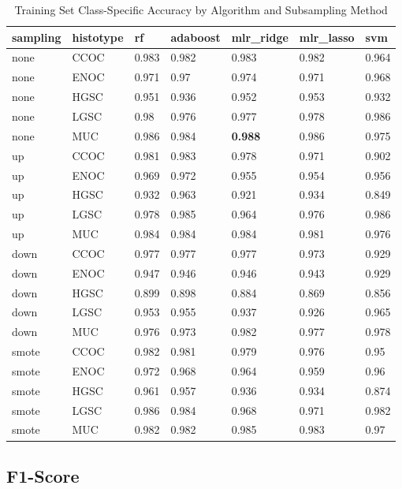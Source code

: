 \documentclass[
]{report}
\begin{document}
\begin{table}

\caption{\label{tab:train-accuracy-class-table}Training Set Class-Specific Accuracy by Algorithm and Subsampling Method}
\centering
\begin{tabular}[t]{l|l|l|l|l|l|l}
\hline
sampling & histotype & rf & adaboost & mlr\_ridge & mlr\_lasso & svm\\
\hline
none & CCOC & 0.983 & 0.982 & 0.983 & 0.982 & 0.964\\
\hline
none & ENOC & 0.971 & 0.97 & 0.974 & 0.971 & 0.968\\
\hline
none & HGSC & 0.951 & 0.936 & 0.952 & 0.953 & 0.932\\
\hline
none & LGSC & 0.98 & 0.976 & 0.977 & 0.978 & 0.986\\
\hline
none & MUC & 0.986 & 0.984 & \textbf{0.988} & 0.986 & 0.975\\
\hline
up & CCOC & 0.981 & 0.983 & 0.978 & 0.971 & 0.902\\
\hline
up & ENOC & 0.969 & 0.972 & 0.955 & 0.954 & 0.956\\
\hline
up & HGSC & 0.932 & 0.963 & 0.921 & 0.934 & 0.849\\
\hline
up & LGSC & 0.978 & 0.985 & 0.964 & 0.976 & 0.986\\
\hline
up & MUC & 0.984 & 0.984 & 0.984 & 0.981 & 0.976\\
\hline
down & CCOC & 0.977 & 0.977 & 0.977 & 0.973 & 0.929\\
\hline
down & ENOC & 0.947 & 0.946 & 0.946 & 0.943 & 0.929\\
\hline
down & HGSC & 0.899 & 0.898 & 0.884 & 0.869 & 0.856\\
\hline
down & LGSC & 0.953 & 0.955 & 0.937 & 0.926 & 0.965\\
\hline
down & MUC & 0.976 & 0.973 & 0.982 & 0.977 & 0.978\\
\hline
smote & CCOC & 0.982 & 0.981 & 0.979 & 0.976 & 0.95\\
\hline
smote & ENOC & 0.972 & 0.968 & 0.964 & 0.959 & 0.96\\
\hline
smote & HGSC & 0.961 & 0.957 & 0.936 & 0.934 & 0.874\\
\hline
smote & LGSC & 0.986 & 0.984 & 0.968 & 0.971 & 0.982\\
\hline
smote & MUC & 0.982 & 0.982 & 0.985 & 0.983 & 0.97\\
\hline
\end{tabular}
\end{table}

\hypertarget{f1-score}{%
\subsection{F1-Score}\label{f1-score}}
\end{document}
